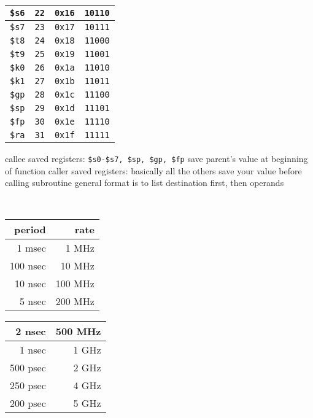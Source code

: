 \documentclass[12pt]{article}
\begin{document}
\begin{spacing}{0.8}
\begin{multicols*}{2}
\begin{flushleft}
\begin{outline}[longenum]
\begin{tabular}{|l r l l|}
  \verb|$s6| & \verb|22| & \verb|0x16| & \verb|10110| \\ \hline
  \verb|$s7| & \verb|23| & \verb|0x17| & \verb|10111| \\ \hline \hline
  \verb|$t8| & \verb|24| & \verb|0x18| & \verb|11000| \\ \hline
  \verb|$t9| & \verb|25| & \verb|0x19| & \verb|11001| \\ \hline \hline
  \verb|$k0| & \verb|26| & \verb|0x1a| & \verb|11010| \\ \hline
  \verb|$k1| & \verb|27| & \verb|0x1b| & \verb|11011| \\ \hline
  \verb|$gp| & \verb|28| & \verb|0x1c| & \verb|11100| \\ \hline
  \verb|$sp| & \verb|29| & \verb|0x1d| & \verb|11101| \\ \hline
  \verb|$fp| & \verb|30| & \verb|0x1e| & \verb|11110| \\ \hline
  \verb|$ra| & \verb|31| & \verb|0x1f| & \verb|11111| \\ \hline
  \end{tabular}
  \1 callee saved registers: \verb|$s0-$s7, $sp, $gp, $fp|
    \2 save parent's value at beginning of function
  \1 caller saved registers: basically all the others
    \2 save your value before calling subroutine
  \1 general format is to list destination first, then operands

\\
\begin{tabular}{|r r|}    \hline
  period   & rate    \\ \hline
    1 msec &   1 MHz \\ \hline
  100 nsec &  10 MHz \\ \hline
   10 nsec & 100 MHz \\ \hline
    5 nsec & 200 MHz \\ \hline
\end{tabular}
\begin{tabular}{|r r|}    \hline
    2 nsec & 500 MHz \\ \hline
    1 nsec & 1 GHz   \\ \hline
  500 psec & 2 GHz   \\ \hline
  250 psec & 4 GHz   \\ \hline
  200 psec & 5 GHz   \\ \hline
\end{tabular}


\end{outline}
\end{flushleft}
\end{multicols*}
\end{spacing}
\end{document}
